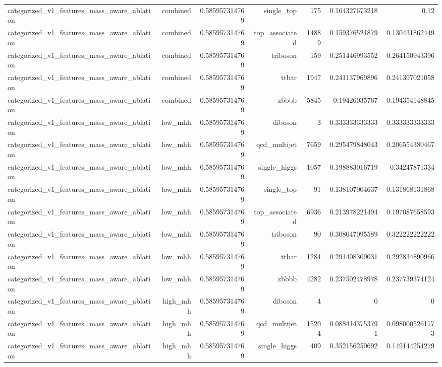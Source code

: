 \begin{table}[htbp]
{\begin{tabular}{lrrrrrr}
categorized\_v1\_features\_mass\_aware\_ablation & combined & 0.585957314769 & single\_top & 175 & 0.164327673218 & 0.12 \\
categorized\_v1\_features\_mass\_aware\_ablation & combined & 0.585957314769 & top\_associated & 14889 & 0.159376521879 & 0.130431862449 \\
categorized\_v1\_features\_mass\_aware\_ablation & combined & 0.585957314769 & triboson & 159 & 0.251446993552 & 0.264150943396 \\
categorized\_v1\_features\_mass\_aware\_ablation & combined & 0.585957314769 & ttbar & 1947 & 0.241137969896 & 0.241397021058 \\
categorized\_v1\_features\_mass\_aware\_ablation & combined & 0.585957314769 & zbbbb & 5845 & 0.19426035767 & 0.194354148845 \\
categorized\_v1\_features\_mass\_aware\_ablation & low\_mhh & 0.585957314769 & diboson & 3 & 0.333333333333 & 0.333333333333 \\
categorized\_v1\_features\_mass\_aware\_ablation & low\_mhh & 0.585957314769 & qcd\_multijet & 7659 & 0.295479848043 & 0.206554380467 \\
categorized\_v1\_features\_mass\_aware\_ablation & low\_mhh & 0.585957314769 & single\_higgs & 1057 & 0.198883016719 & 0.34247871334 \\
categorized\_v1\_features\_mass\_aware\_ablation & low\_mhh & 0.585957314769 & single\_top & 91 & 0.138107004637 & 0.131868131868 \\
categorized\_v1\_features\_mass\_aware\_ablation & low\_mhh & 0.585957314769 & top\_associated & 6936 & 0.213978221494 & 0.197087658593 \\
categorized\_v1\_features\_mass\_aware\_ablation & low\_mhh & 0.585957314769 & triboson & 90 & 0.308047095589 & 0.322222222222 \\
categorized\_v1\_features\_mass\_aware\_ablation & low\_mhh & 0.585957314769 & ttbar & 1284 & 0.291408309031 & 0.292834890966 \\
categorized\_v1\_features\_mass\_aware\_ablation & low\_mhh & 0.585957314769 & zbbbb & 4282 & 0.237502478978 & 0.237739374124 \\
categorized\_v1\_features\_mass\_aware\_ablation & high\_mhh & 0.585957314769 & diboson & 4 & 0 & 0 \\
categorized\_v1\_features\_mass\_aware\_ablation & high\_mhh & 0.585957314769 & qcd\_multijet & 15204 & 0.0884143753791 & 0.0980005261773 \\
categorized\_v1\_features\_mass\_aware\_ablation & high\_mhh & 0.585957314769 & single\_higgs & 409 & 0.352156250692 & 0.149144254279 \\

\end{tabular}}
\end{table}
